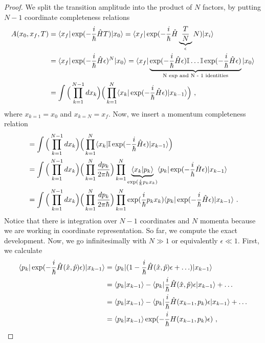     \begin{proof}
        We split the transition amplitude into the product of $N$ factors, by putting $N-1$ coordinate completeness relations
        \begin{equation*}
        \begin{aligned}
            A (x_0, x_f, T) & = \langle x_f\vert \exp(- \frac{i}{\hbar} \hat H T) \vert x_0\rangle = \langle x_f\vert \exp(- \frac{i}{\hbar} \hat H \underbrace{\frac{T}{N}}_\epsilon N) \vert x_i\rangle \\ & = \langle x_f\vert \exp(- \frac{i}{\hbar} \hat H \epsilon)^N \vert x_0\rangle = \langle x_f\vert \underbrace{\exp(- \frac{i}{\hbar} \hat H \epsilon) \mathbb I \ldots \mathbb I \exp(- \frac{i}{\hbar} \hat H \epsilon)}_{\text{N exp and N - 1 identities}} \vert x_0\rangle \\ & = \int \Big ( \prod_{k=1}^{N-1} dx_k \Big) \Big ( \prod_{k=1}^{N} \langle x_k\vert \exp(- \frac{i}{\hbar} \hat H \epsilon) \vert x_{k-1}\rangle \Big) ~,
        \end{aligned}
        \end{equation*}
        where $x_{k=1} = x_0$ and $x_{k=N} = x_f$. 
        Now, we insert a momentum completeness relation 
        \begin{equation*}
        \begin{aligned}
            & = \int \Big ( \prod_{k=1}^{N-1} dx_k \Big) \Big ( \prod_{k=1}^{N} \langle x_k\vert \mathbb I \exp(- \frac{i}{\hbar} \hat H \epsilon) \vert x_{k-1}\rangle \Big) \\ & = \int \Big ( \prod_{k=1}^{N-1} dx_k \Big) \Big ( \prod_{k=1}^{N} \frac{dp_k}{2 \pi \hbar} \Big) \prod_{k=1}^{N}\underbrace{\langle x_k\vert p_k\rangle}_{\exp(\frac{i}{\hbar} p_k x_k)} \langle p_k\vert \exp(- \frac{i}{\hbar} \hat H \epsilon) \vert x_{k-1}\rangle \\ & = \int \Big ( \prod_{k=1}^{N-1} dx_k \Big) \Big ( \prod_{k=1}^{N} \frac{dp_k}{2 \pi \hbar} \Big) \prod_{k=1}^{N} \exp(\frac{i}{\hbar} p_k x_k) \langle p_k\vert \exp(- \frac{i}{\hbar} \hat H \epsilon) \vert x_{k-1}\rangle ~.
        \end{aligned}
        \end{equation*}
        Notice that there is integration over $N-1$ coordinates and $N$ momenta because we are working in coordinate representation. So far, we compute the exact development. Now, we go infinitesimally with $N \gg 1$ or equivalently $\epsilon \ll 1$. First, we calculate 
        \begin{equation*}
        \begin{aligned}
            \bra{p_k} \exp(- \frac{i}{\hbar} \hat H(\hat x, \hat p) \epsilon) \ket{x_{k-1}} & = \bra{p_k} (1 - \frac{i}{\hbar} \hat H (\hat x, \hat p) \epsilon + \ldots) \ket{x_{k-1}} \\ & = \braket{p_k}{x_{k-1}} - \bra{p_k} \frac{i}{\hbar} \hat H (\hat x, \hat p) \epsilon \ket{x_{k-1}} + \ldots \\ & = \braket{p_k}{x_{k-1}} - \bra{p_k} \frac{i}{\hbar} \hat H (x_{k-1}, p_k) \epsilon \ket{x_{k-1}} + \ldots \\ & = \braket{p_k}{x_{k-1}} \exp(- \frac{i}{\hbar} H (x_{k-1}, p_k) \epsilon) ~,

\end{aligned}
\end{equation*}
\end{proof}
